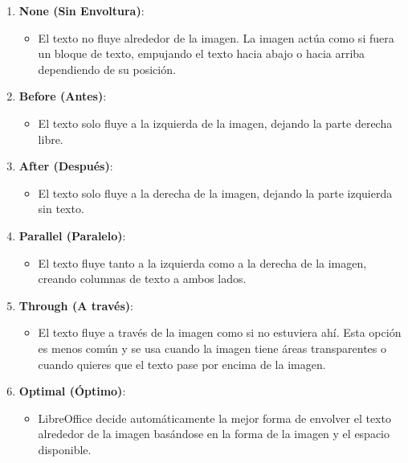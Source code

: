 \documentclass[
  jou,
  floatsintext,
  longtable,
  a4paper,
  nolmodern,
  notxfonts,
  notimes,
  12pt,
  colorlinks=true,linkcolor=blue,citecolor=blue,urlcolor=blue]{apa7}
\providecommand{\tightlist}{%
  \setlength{\itemsep}{0pt}\setlength{\parskip}{0pt}}
\begin{document}
\begin{enumerate}
\def\labelenumi{\arabic{enumi}.}
\item
  \textbf{None (Sin Envoltura)}:

  \begin{itemize}
  \tightlist
  \item
    El texto no fluye alrededor de la imagen. La imagen actúa como si
    fuera un bloque de texto, empujando el texto hacia abajo o hacia
    arriba dependiendo de su posición.
  \end{itemize}
\item
  \textbf{Before (Antes)}:

  \begin{itemize}
  \tightlist
  \item
    El texto solo fluye a la izquierda de la imagen, dejando la parte
    derecha libre.
  \end{itemize}
\item
  \textbf{After (Después)}:

  \begin{itemize}
  \tightlist
  \item
    El texto solo fluye a la derecha de la imagen, dejando la parte
    izquierda sin texto.
  \end{itemize}
\item
  \textbf{Parallel (Paralelo)}:

  \begin{itemize}
  \tightlist
  \item
    El texto fluye tanto a la izquierda como a la derecha de la imagen,
    creando columnas de texto a ambos lados.
  \end{itemize}
\item
  \textbf{Through (A través)}:

  \begin{itemize}
  \tightlist
  \item
    El texto fluye a través de la imagen como si no estuviera ahí. Esta
    opción es menos común y se usa cuando la imagen tiene áreas
    transparentes o cuando quieres que el texto pase por encima de la
    imagen.
  \end{itemize}
\item
  \textbf{Optimal (Óptimo)}:

  \begin{itemize}
  \tightlist
  \item
    LibreOffice decide automáticamente la mejor forma de envolver el
    texto alrededor de la imagen basándose en la forma de la imagen y el
    espacio disponible.
  \end{itemize}
\end{enumerate}
\end{document}
